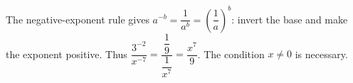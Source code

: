 The negative-exponent rule gives $a^{-b}=\dfrac{1}{a^b}=\left(\dfrac{1}{a}\right)^b$: invert the base and make the exponent positive. Thus $\dfrac{3^{-2}}{x^{-7}}=\dfrac{\dfrac{1}{9}}{\dfrac{1}{x^7}}=\boxed{\dfrac{x^7}{9}}$. The condition $x\ne0$ is necessary.
